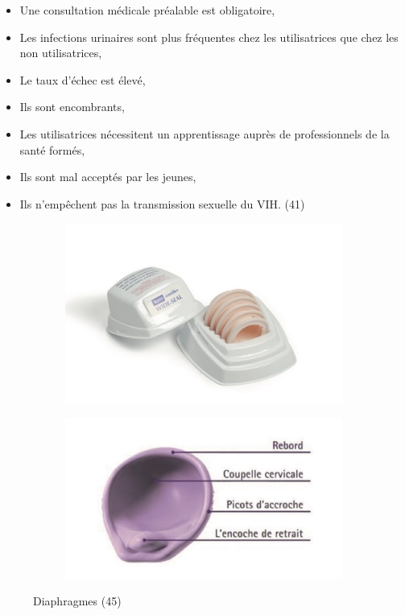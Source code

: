 \begin{itemize}[label={$\bullet$}, align=right]
  \item Une consultation médicale préalable est obligatoire,
  \item Les infections urinaires sont plus fréquentes chez les utilisatrices que chez les non utilisatrices,
  \item Le taux d’échec est élevé,
  \item Ils sont encombrants,
  \item Les utilisatrices nécessitent un apprentissage auprès de professionnels de la santé formés,
  \item Ils sont mal acceptés par les jeunes,
  \item Ils n’empêchent pas la transmission sexuelle du VIH. (41)  

\end{itemize}

\begin{figure}[H]
  \centering
  \begin{subfigure}[b]{0.45\textwidth}
      \centering
      \includegraphics[width=\textwidth]{Images/fig_21a.jpg}
  \end{subfigure}
  \hfill
  \begin{subfigure}[b]{0.45\textwidth}
      \centering
      \includegraphics[width=\textwidth]{Images/fig_21b.jpg}
  \end{subfigure}
  \caption{Diaphragmes (45)}
\end{figure}

